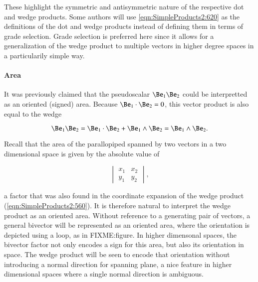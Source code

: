 These highlight the symmetric and antisymmetric nature of the respective dot and wedge products.  Some authors will use \cref{eqn:SimpleProducts2:620} as the definitions of the dot and wedge products instead of defining them in terms of grade selection.  Grade selection is preferred here since it allows for a generalization of the wedge product to multiple vectors in higher degree spaces in a particularily simple way.

\paragraph{Area}

It was previously claimed that the pseudoscalar \( \Be_1 \Be_2 \) could be interpretted as an oriented (signed) area.  Because \( \Be_1 \cdot \Be_2 = 0 \), this vector product is also equal to the wedge

\begin{dmath}\label{eqn:SimpleProducts2:640}
\Be_1 \Be_2 = \Be_1 \cdot \Be_2 +
\Be_1 \wedge \Be_2
=
\Be_1 \wedge \Be_2.
\end{dmath}

Recall that the area of the parallopiped spanned by two vectors in a two dimensional space is given by the absolute value of

\begin{dmath}\label{eqn:SimpleProducts2:660}
\begin{vmatrix}
   x_1 & x_2 \\
   y_1 & y_2
\end{vmatrix},
\end{dmath}

a factor that was also found in the coordinate expansion of the wedge product (\cref{eqn:SimpleProducts2:560}).  It is therefore natural to interpret the wedge product as an oriented area.
Without reference to a generating pair of vectors, a general bivector will be represented as an oriented area, where the orientation is depicted using a loop, as in
FIXME:figure.
In higher dimensonal spaces, the bivector factor not only encodes a sign for this area, but also its orientation in space.  The wedge product will be seen to encode that orientation without introducing a normal direction for spanning plane, a nice feature in higher dimensional spaces where a single normal direction is ambiguous.
